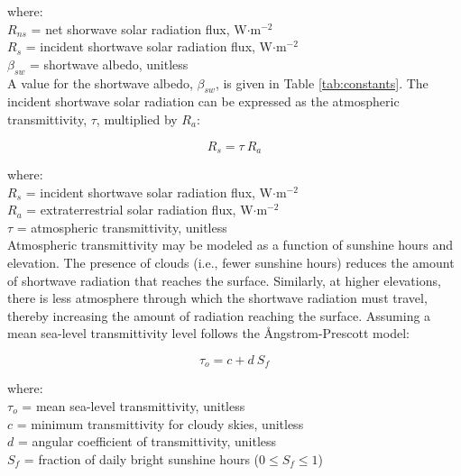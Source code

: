 \noindent where: \\
\indent $R_{ns}$ = net shorwave solar radiation flux, W$\cdot$m$^{-2}$ \\
\indent $R_s$ = incident shortwave solar radiation flux, W$\cdot$m$^{-2}$ \\
\indent $\beta_{sw}$ = shortwave albedo, unitless \\

\noindent A value for the shortwave albedo, $\beta_{sw}$, is given in Table \ref{tab:constants}. 
The incident shortwave solar radiation can be expressed as the atmospheric transmittivity, $\tau$, multiplied by $R_a$:

\begin{equation}
\label{eq:rs}
	R_s = \tau\: R_a
\end{equation}

\noindent where: \\
\indent $R_s$ = incident shortwave solar radiation flux, W$\cdot$m$^{-2}$ \\
\indent $R_a$ = extraterrestrial solar radiation flux, W$\cdot$m$^{-2}$ \\
\indent $\tau$ = atmospheric transmittivity, unitless \\

Atmospheric transmittivity may be modeled as a function of sunshine hours and elevation. 
The presence of clouds (i.e., fewer sunshine hours) reduces the amount of shortwave radiation that reaches the surface. 
Similarly, at higher elevations, there is less atmosphere through which the shortwave radiation must travel, thereby increasing the amount of radiation reaching the surface. 
Assuming a mean sea-level transmittivity level follows the \r{A}ngstrom-Prescott model:

\begin{equation}
\label{eq:tauo}
	\tau_o = c + d\: S_f 
\end{equation}

\noindent where: \\
\indent $\tau_o$ = mean sea-level transmittivity, unitless \\
\indent $c$ = minimum transmittivity for cloudy skies, unitless \\
\indent $d$ = angular coefficient of transmittivity, unitless \\
\indent $S_f$ = fraction of daily bright sunshine hours ($0\leq S_f\leq 1$) \\

